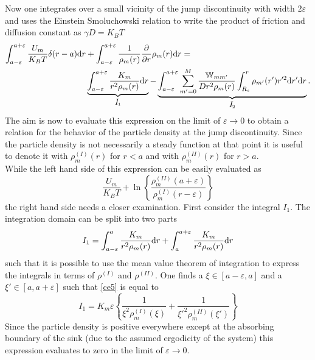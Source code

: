 Now one integrates over a small vicinity of the jump discontinuity with width $2 \varepsilon$ and uses the Einstein Smoluchowski relation to write the product of friction and diffusion constant as $\gamma D = K_B T$
\begin{align}
    \int_{a-\varepsilon}^{a + \varepsilon} \frac{U_m}{K_B T}\delta(r-a) {\rm d}r &+ \int_{a-\varepsilon}^{a + \varepsilon} \frac{1}{\rho_m(r)}\frac{\partial}{\partial r} \rho_m(r){\rm d} r = \nonumber \\
    & \underbrace{\int_{a-\varepsilon}^{a+\varepsilon}\frac{K_m}{r^2 \rho_m(r)}{\rm d}r}_{\textit{\normalsize I}_1} - \underbrace{\int_{a-\varepsilon}^{a+\varepsilon}\sum_{m'=0}^{M} \frac{\mathbb{W}_{mm'}}{Dr^2 \rho_m(r)}\int_{R_s}^{r}\rho_{m'}(r')r'^2{\rm d}r'{\rm d}r}_{\textit{\normalsize I}_2}.
    \label{ce3}
    \end{align}
    The aim is now to evaluate this expression on the limit of $\varepsilon \rightarrow 0$ to obtain a relation for the behavior of the particle density at the jump discontinuity. Since the particle density is not necessarily a steady function at that point it is useful to denote it with $\rho^{(I)}_m(r)$ for $r<a$ and with $\rho^{(II)}_m(r)$ for $r>a$. \\
While the left hand side of this expression can be easily evaluated as
\begin{equation}
    \frac{U_m}{K_B T} + \ln \left\{\frac{\rho^{(II)}_m(a+\varepsilon)}{\rho^{(I)}_m(r-\varepsilon)}\right\}
    \label{ce4}
\end{equation}
the right hand side needs a closer examination. First consider the integral $I_1$. The integration domain can be split into two parts
\begin{equation}
    I_1 = \int_{a-\varepsilon}^{a}\frac{K_m}{r^2 \rho_m(r)}{\rm d}r + \int_{a}^{a+\varepsilon}\frac{K_m}{r^2 \rho_m(r)}{\rm d}r
    \label{ce5}
\end{equation}
such that it is possible to use the mean value theorem of integration to express the integrals in terms of $\rho^{(I)}$ and $\rho^{(II)}$. 
One finds a $\xi \in [a-\varepsilon,a]$ and a $\xi' \in [a, a+\varepsilon]$ such that \eqref{ce5} is equal to
\begin{equation}
    I_1 = K_m \varepsilon \left\{ \frac{1}{\xi^{2} \rho^{(I)}_{m}(\xi)} + \frac{1}{\xi'^{2}\rho^{(II)}_m(\xi')} \right\}
    \label{ce6}
\end{equation}
Since the particle density is positive everywhere except at the absorbing boundary of the sink (due to the assumed ergodicity of the system) this expression evaluates to zero in the limit of $\varepsilon \rightarrow 0$. \\
